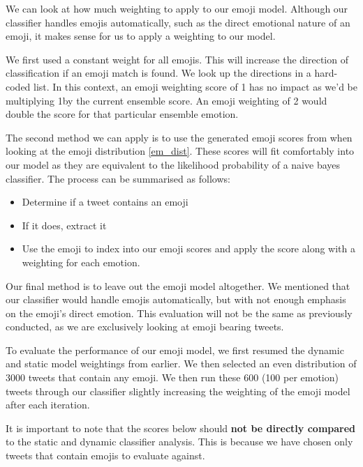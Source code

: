 {We can look at how much weighting to apply to our emoji model. Although our classifier handles emojis automatically, such as the direct emotional nature of an emoji, it makes sense for us to apply a weighting to our model.

We first used a constant weight for all emojis. This will increase the direction of classification if an emoji match is found. We look up the directions in a hard-coded list. In this context, an emoji weighting score of 1 has no impact as we'd be multiplying 1by the current ensemble score. An emoji weighting of 2 would double the score for that particular ensemble emotion.

The second method we can apply is to use the generated emoji scores from when looking at the emoji distribution \ref{em_dist}. These scores will fit comfortably into our model as they are equivalent to the likelihood probability of a naive bayes classifier. The process can be summarised as follows:

\begin{itemize}
\item Determine if a tweet contains an emoji
\item If it does, extract it
\item Use the emoji to index into our emoji scores and apply the score along with a weighting for each emotion.
\end{itemize}

Our final method is to leave out the emoji model altogether. We mentioned that our classifier would handle emojis automatically, but with not enough emphasis on the emoji's direct emotion. This evaluation will not be the same as previously conducted, as we are exclusively looking at emoji bearing tweets.

To evaluate the performance of our emoji model, we first resumed the dynamic and static model weightings from earlier. We then selected an even distribution of 3000 tweets that contain any emoji. We then run these 600 (100 per emotion) tweets through our classifier slightly increasing the weighting of the emoji model after each iteration.

It is important to note that the scores below should \textbf{not be directly compared} to the static and dynamic classifier analysis. This is because we have chosen only tweets that contain emojis to evaluate against.

}
